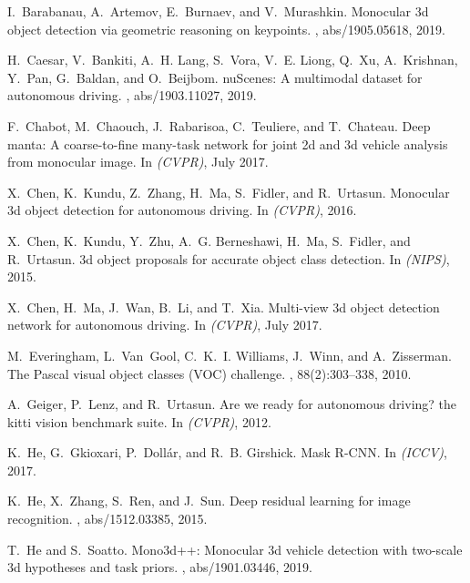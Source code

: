 \documentclass[10pt,twocolumn,letterpaper]{article}
\begin{document}
{
\small
\begin{thebibliography}{10}\itemsep=-1pt

I.~Barabanau, A.~Artemov, E.~Burnaev, and V.~Murashkin.
\newblock Monocular 3d object detection via geometric reasoning on keypoints.
, abs/1905.05618, 2019.

H.~Caesar, V.~Bankiti, A.~H. Lang, S.~Vora, V.~E. Liong, Q.~Xu, A.~Krishnan,
  Y.~Pan, G.~Baldan, and O.~Beijbom.
\newblock nu{S}cenes: {A} multimodal dataset for autonomous driving.
, abs/1903.11027, 2019.

F.~Chabot, M.~Chaouch, J.~Rabarisoa, C.~Teuliere, and T.~Chateau.
\newblock Deep manta: A coarse-to-fine many-task network for joint 2d and 3d
  vehicle analysis from monocular image.
\newblock In {\em (CVPR)}, July 2017.

X.~Chen, K.~Kundu, Z.~Zhang, H.~Ma, S.~Fidler, and R.~Urtasun.
\newblock Monocular 3d object detection for autonomous driving.
\newblock In {\em (CVPR)}, 2016.

X.~Chen, K.~Kundu, Y.~Zhu, A.~G. Berneshawi, H.~Ma, S.~Fidler, and R.~Urtasun.
\newblock 3d object proposals for accurate object class detection.
\newblock In {\em (NIPS)}, 2015.

X.~Chen, H.~Ma, J.~Wan, B.~Li, and T.~Xia.
\newblock Multi-view 3d object detection network for autonomous driving.
\newblock In {\em (CVPR)}, July 2017.

M.~Everingham, L.~Van~Gool, C.~K.~I. Williams, J.~Winn, and A.~Zisserman.
\newblock The {P}ascal visual object classes {(VOC)} challenge.
, 88(2):303--338, 2010.

A.~Geiger, P.~Lenz, and R.~Urtasun.
\newblock Are we ready for autonomous driving? the kitti vision benchmark
  suite.
\newblock In {\em (CVPR)}, 2012.

K.~He, G.~Gkioxari, P.~Doll{\'{a}}r, and R.~B. Girshick.
\newblock Mask {R-CNN}.
\newblock In {\em (ICCV)}, 2017.

K.~He, X.~Zhang, S.~Ren, and J.~Sun.
\newblock Deep residual learning for image recognition.
, abs/1512.03385, 2015.

T.~He and S.~Soatto.
\newblock Mono3d++: Monocular 3d vehicle detection with two-scale 3d hypotheses
  and task priors.
, abs/1901.03446, 2019.


\end{thebibliography}}
\end{document}
